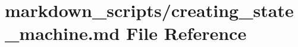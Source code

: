 \hypertarget{creating__state__machine_8md}{\section{markdown\-\_\-scripts/creating\-\_\-state\-\_\-machine.md File Reference}
\label{creating__state__machine_8md}
}
